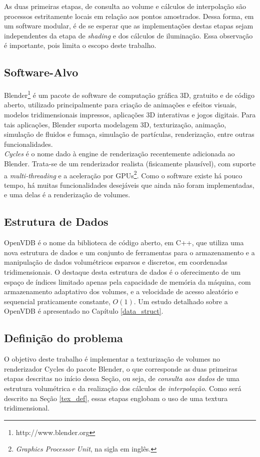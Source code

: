 As duas primeiras etapas, de consulta ao volume e cálculos de interpolação são processos estritamente locais em relação aos pontos amostrados. Dessa forma, em um software modular, é de se esperar que as implementações destas etapas sejam independentes da etapa de \emph{shading} e dos cálculos de iluminação. Essa observação é importante, pois limita o escopo deste trabalho.

\subsection*{Software-Alvo}
Blender\footnote{http://www.blender.org} é um pacote de software de computação gráfica 3D, gratuito e de código aberto, utilizado principalmente para criação de animações e efeitos visuais, modelos tridimensionais impressos, aplicações 3D interativas e jogos digitais. Para tais aplicações, Blender suporta modelagem 3D, texturização, animação, simulação de fluidos e fumaça, simulação de partículas, renderização, entre outras funcionalidades. \\

\emph{Cycles} é o nome dado à engine de renderização recentemente adicionada ao Blender. Trata-se de um renderizador realista (fisicamente plausível), com suporte a \emph{multi-threading} e a aceleração por GPUs\footnote{\emph{Graphics Processor Unit}, na sigla em inglês.}. Como o software existe há pouco tempo, há muitas funcionalidades desejáveis que ainda não foram implementadas, e uma delas é a renderização de volumes.

\subsection*{Estrutura de Dados}
OpenVDB é o nome da biblioteca de código aberto, em C++, que utiliza uma nova estrutura de dados e um conjunto de ferramentas para o armazenamento e a manipulação de dados volumétricos esparsos e discretos, em coordenadas tridimensionais. O destaque desta estrutura de dados é o oferecimento de um espaço de índices limitado apenas pela capacidade de memória da máquina, com armazenamento adaptativo dos volumes, e a velocidade de acesso aleatório e sequencial praticamente constante, $O(1)$. Um estudo detalhado sobre a OpenVDB é apresentado no Capítulo \ref{data_struct}.

\subsection*{Definição do problema}
\label{def_problem}
O objetivo deste trabalho é implementar a texturização de volumes no renderizador Cycles do pacote Blender, o que corresponde as duas primeiras etapas descritas no início dessa Seção, ou seja, de \emph{consulta aos dados} de uma estrutura volumétrica e da realização dos cálculos de \emph{interpolação}. Como será descrito na Seção \ref{tex_def}, essas etapas englobam o uso de uma textura tridimensional.\\


